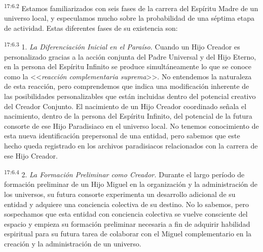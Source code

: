 \par
\textsuperscript{17:6.2} Estamos familiarizados con seis fases de la carrera del Espíritu Madre de un universo local, y especulamos mucho sobre la probabilidad de una séptima etapa de actividad. Estas diferentes fases de su existencia son:

\par
\textsuperscript{17:6.3} 1. \textit{La Diferenciación Inicial en el Paraíso.} Cuando un Hijo Creador es personalizado gracias a la acción conjunta del Padre Universal y del Hijo Eterno, en la persona del Espíritu Infinito se produce simultáneamente lo que se conoce como la <<\textit{reacción complementaria suprema}>>. No entendemos la naturaleza de esta reacción, pero comprendemos que indica una modificación inherente de las posibilidades personalizables que están incluidas dentro del potencial creativo del Creador Conjunto. El nacimiento de un Hijo Creador coordinado señala el nacimiento, dentro de la persona del Espíritu Infinito, del potencial de la futura consorte de ese Hijo Paradisiaco en el universo local. No tenemos conocimiento de esta nueva identificación prepersonal de una entidad, pero sabemos que este hecho queda registrado en los archivos paradisiacos relacionados con la carrera de ese Hijo Creador.

\par
\textsuperscript{17:6.4} 2. \textit{La Formación Preliminar como Creador.} Durante el largo período de formación preliminar de un Hijo Miguel en la organización y la administración de los universos, su futura consorte experimenta un desarrollo adicional de su entidad y adquiere una conciencia colectiva de su destino. No lo sabemos, pero sospechamos que esta entidad con conciencia colectiva se vuelve consciente del espacio y empieza su formación preliminar necesaria a fin de adquirir habilidad espiritual para su futura tarea de colaborar con el Miguel complementario en la creación y la administración de un universo.

